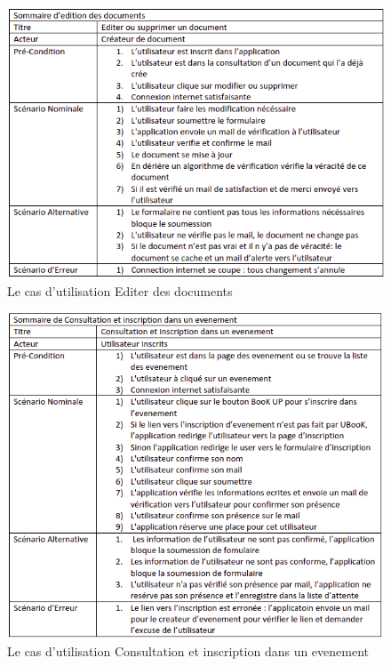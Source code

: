 \documentclass[12pt]{report}
\begin{document}
\newpage

\begin{figure}[h]
    \centering
    \includegraphics[width=1\textwidth]{documentEdit}
    \caption{Le cas d'utilisation Editer des documents}
    \label{fig:mesh6}
\end{figure}

\newpage


\begin{figure}[h]
    \centering
    \includegraphics[width=1\textwidth]{eventConsult}
    \caption{Le cas d'utilisation Consultation et inscription dans un evenement}
    \label{fig:mesh6}
\end{figure}
\end{document}
